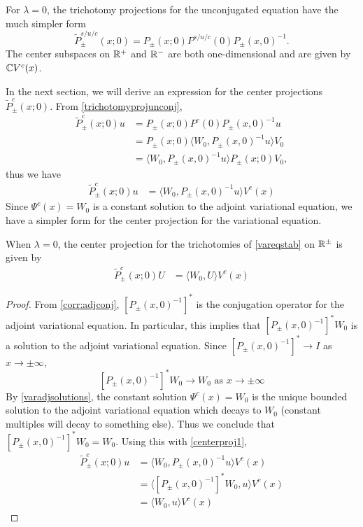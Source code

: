 \documentclass[thesis.tex]{subfiles}
\begin{document}
For $\lambda = 0$, the trichotomy projections for the unconjugated equation have the much simpler form
\begin{equation}\label{trichotomyprojunconj}
\tilde{P}^{s/u/c}_\pm(x; 0) = P_\pm(x; 0) P^{s/u/c}(0) P_\pm(x, 0)^{-1}.
\end{equation}
The center subspaces on $\mathbb{R}^+$ and $\mathbb{R}^-$ are both one-dimensional and are given by $\mathbb{C} V^c(x)$. 

In the next section, we will derive an expression for the center projections $\tilde{P}^c_\pm(x; 0)$. From \cref{trichotomyprojunconj},
\begin{align*}
\tilde{P}^c_\pm(x; 0) u &= P_\pm(x; 0) P^c(0) P_\pm(x, 0)^{-1} u \\
&= P_\pm(x; 0) \langle W_0, P_\pm(x, 0)^{-1} u \rangle V_0 \\
&= \langle W_0, P_\pm(x, 0)^{-1} u \rangle P_\pm(x; 0) V_0,
\end{align*}
thus we have
\begin{align}\label{centerproj1}
\tilde{P}^c_\pm(x; 0) u 
&= \langle W_0, P_\pm(x, 0)^{-1} u \rangle V^c(x)
\end{align}
Since $\Psi^c(x) = W_0$ is a constant solution to the adjoint variational equation, we have a simpler form for the center projection for the variational equation. 

\begin{lemma}\label{centerprojlemma}
When $\lambda = 0$, the center projection for the trichotomies of \cref{vareqstab} on $\mathbb{R}^\pm$ is given by 
\begin{align}\label{centerproj}
\tilde{P}^c_\pm(x; 0) U &= \langle W_0, U \rangle V^c(x)
\end{align}
\begin{proof}
From \cref{corr:adjconj}, $[P_\pm(x, 0)^{-1}]^*$ is the conjugation operator for the adjoint variational equation. In particular, this implies that $[P_\pm(x, 0)^{-1}]^* W_0$ is a solution to the adjoint variational equation. Since $[P_\pm(x, 0)^{-1}]^* \rightarrow I$ as $x \rightarrow \pm \infty$, 
\[
[P_\pm(x, 0)^{-1}]^* W_0 \rightarrow W_0 \text{ as }x \rightarrow \pm \infty
\]
By \cref{varadjsolutions}, the constant solution $\Psi^c(x) = W_0$ is the unique bounded solution to the adjoint variational equation which decays to $W_0$ (constant multiples will decay to something else). Thus we conclude that $[P_\pm(x, 0)^{-1}]^* W_0 = W_0$. Using this with \cref{centerproj1},
\begin{align*}
\tilde{P}^c_\pm(x; 0) u 
&= \langle W_0, P_\pm(x, 0)^{-1} u \rangle V^c(x) \\
&= \langle [P_\pm(x, 0)^{-1}]^*W_0, u \rangle V^c(x) \\
&= \langle W_0, u \rangle V^c(x) 
\end{align*}
\end{proof}
\end{lemma}
\end{document}
